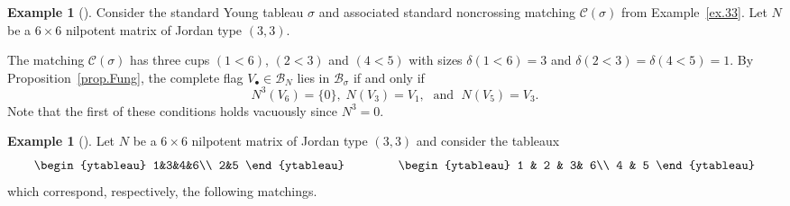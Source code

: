 \documentclass[11pt]{amsart}
\theoremstyle{remark}
\theoremstyle{remark}
\theoremstyle{definition}
\theoremstyle{definition}
\theoremstyle{definition}
\newtheorem{eg_no_qed}[theorem]{Example}
\newenvironment{ex}[1][]{\begin{eg_no_qed}[#1]\renewcommand{\qedsymbol}{$\Diamond$}\pushQED{\qed}}{\popQED\end{eg_no_qed}}
\numberwithin{equation}{section}
\newcommand{\gd}{\delta}
\newcommand{\gs}{\sigma}
\newcommand{\cb}{\mathcal{B}}
\newcommand{\cc}{\mathcal{C}}
\newcommand{\SF}{\mathcal{B}}
\newcommand{\cupsigma}{\cc(\gs)}
\begin{document}
\begin{ex}
Consider the standard Young tableau $\gs$ and associated standard noncrossing matching $\cupsigma$ from Example~\ref{ex.33}. Let $N$ be a $6\times 6$ nilpotent matrix of Jordan type $(3,3)$. 

The matching $\cupsigma$ has three cups $(1<6)$, $ (2<3)$ and $(4<5)$ with sizes $\gd(1<6)=3$ and $\gd(2<3)=\gd(4<5)=1$. By Proposition~\ref{prop.Fung}, the complete flag $V_\bullet\in \SF_N$ lies in $\cb_\gs$ if and only if
\[
N^3\left(V_6\right)=\{0\}, \;  N\left(V_3\right)=V_1, \;  \text{ and }\; N\left(V_5\right)=V_3.
\]
Note that the first of these conditions holds vacuously since $N^3 = 0$. 
\end{ex}


\begin{ex}\label{ex.component.disconn} Let $N$ be a $6\times 6$ nilpotent matrix of Jordan type $(3,3)$ and consider the tableaux
\[
\begin{ytableau} 1&3&4&6\\ 2&5
\end{ytableau} \quad\quad\quad\quad \;
\begin{ytableau} 1 & 2 & 3& 6\\ 4 & 5
\end{ytableau}
\]
which correspond, respectively, the following matchings.\\

\begin{center}
 \hspace*{.5in}
\end{center}
\end{ex}
\end{document}
